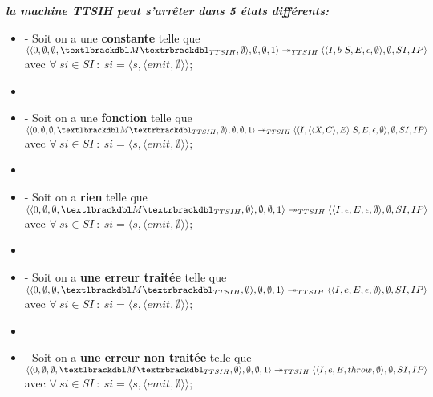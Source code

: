 \documentclass[10pt,a4paper]{report}
\begin{document}
	
	\textbf{\textit{la machine TTSIH peut s'arrêter dans 5 états différents:}}
	\smallbreak
	\begin{itemize}
		\item[] - Soit on a une \textbf{constante} telle que 
		$\langle\langle 0,\emptyset,\emptyset,\textlbrackdbl M\textrbrackdbl_{TTSIH},\emptyset\rangle,\emptyset,\emptyset,1\rangle 
		\twoheadrightarrow_{TTSIH} 
		\langle\langle I,b~S,E,\epsilon,\emptyset\rangle,\emptyset,SI,IP\rangle$
		\\ avec $\forall~si \in SI~:~si = \langle s,\langle emit,\emptyset\rangle\rangle$;
		\item[] 
		\item[] - Soit on a une \textbf{fonction} telle que
		$\langle\langle 0,\emptyset,\emptyset,\textlbrackdbl M\textrbrackdbl_{TTSIH},\emptyset\rangle,\emptyset,\emptyset,1\rangle 
		\twoheadrightarrow_{TTSIH} 
		\langle\langle I,\langle\langle X,C\rangle,E\rangle~S,E,\epsilon,\emptyset\rangle,\emptyset,SI,IP\rangle$
		\\ avec $\forall~si \in SI~:~si = \langle s,\langle emit,\emptyset\rangle\rangle$;
		\item[] 
		\item[] - Soit on a \textbf{rien} telle que  
		$\langle\langle 0,\emptyset,\emptyset,\textlbrackdbl M\textrbrackdbl_{TTSIH},\emptyset\rangle,\emptyset,\emptyset,1\rangle 
		\twoheadrightarrow_{TTSIH} 
		\langle\langle I,\epsilon,E,\epsilon,\emptyset\rangle,\emptyset,SI,IP\rangle$
		\\ avec $\forall~si \in SI~:~si = \langle s,\langle emit,\emptyset\rangle\rangle$;
		\item[]
		\item[] - Soit on a \textbf{une erreur traitée} telle que  
		$\langle\langle 0,\emptyset,\emptyset,\textlbrackdbl M\textrbrackdbl_{TTSIH},\emptyset\rangle,\emptyset,\emptyset,1\rangle 
		\twoheadrightarrow_{TTSIH} 
		\langle\langle I,e,E,\epsilon,\emptyset\rangle,\emptyset,SI,IP\rangle$
		\\ avec $\forall~si \in SI~:~si = \langle s,\langle emit,\emptyset\rangle\rangle$;
		\item[]
		\item[] - Soit on a \textbf{une erreur non traitée} telle que  
		$\langle\langle 0,\emptyset,\emptyset,\textlbrackdbl M\textrbrackdbl_{TTSIH},\emptyset\rangle,\emptyset,\emptyset,1\rangle 
		\twoheadrightarrow_{TTSIH} 
		\langle\langle I,e,E,throw,\emptyset\rangle,\emptyset,SI,IP\rangle$
		\\ avec $\forall~si \in SI~:~si = \langle s,\langle emit,\emptyset\rangle\rangle$;
	\end{itemize}
	\bigbreak
	
\end{document}

